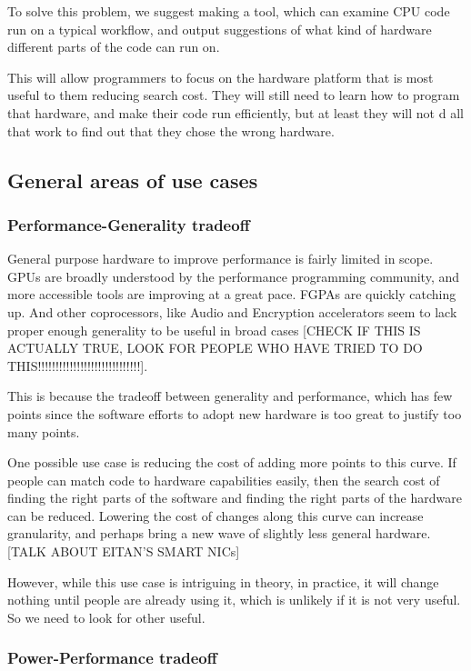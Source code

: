 \documentclass[12pt,twoside]{reedthesis}
\begin{document}
		To solve this problem, we suggest making a tool, which can examine CPU code run on a typical workflow, and output suggestions of what kind of hardware different parts of the code can run on. 
		
		This will allow programmers to focus on the hardware platform that is most useful to them reducing search cost. They will still need to learn how to program that hardware, and make their code run efficiently, but at least they will not d all that work to find out that they chose the wrong hardware. 
		
		\subsection{General areas of use cases}
		
		\subsubsection{Performance-Generality tradeoff}
		
		General purpose hardware to improve performance is fairly limited in scope. GPUs are broadly understood by the performance programming community, and more accessible tools are improving at a great pace. FGPAs are quickly catching up. And other coprocessors, like Audio and Encryption accelerators seem to lack proper enough generality to be useful in broad cases [CHECK IF THIS IS ACTUALLY TRUE, LOOK FOR PEOPLE WHO HAVE TRIED TO DO THIS!!!!!!!!!!!!!!!!!!!!!!!!!!!!!].
		
		This is because the tradeoff between generality and performance, which has few points since the software efforts to adopt new hardware is too great to justify too many points.
		
		One possible use case is reducing the cost of adding more points to this curve. If people can match code to hardware capabilities easily, then the search cost of finding the right parts of the software and finding the right parts of the hardware can be reduced. Lowering the cost of changes along this curve can increase granularity, and perhaps bring a new wave of slightly less general hardware. [TALK ABOUT EITAN'S SMART NICs]
		
		However, while this use case is intriguing in theory, in practice, it will change nothing until people are already using it,  which is unlikely if it is not very useful. So we need to look for other useful. 
		
		\subsubsection{Power-Performance tradeoff}
		
\end{document}

